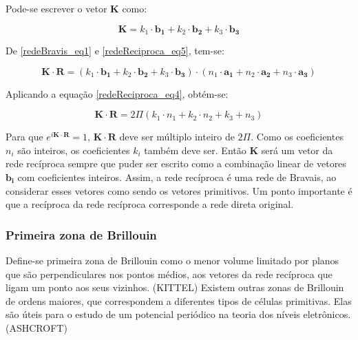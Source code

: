 \documentclass[11pt]{article}
\numberwithin{equation}{section}
\begin{document}
      \par Pode-se escrever o vetor \textbf{K} como:

      \begin{equation}\label{redeReciproca_eq5}
        \mathbf{K} = k_{1}\cdot \mathbf{b_{1}} + k_{2}\cdot \mathbf{b_{2}} + k_{3}\cdot \mathbf{b_{3}}
      \end{equation}

      \par De \eqref{redeBravis_eq1} e \eqref{redeReciproca_eq5}, tem-se:

      \begin{equation}\label{redeReciproca_eq6}
        \mathbf{K} \cdot \mathbf{R} = (k_{1} \cdot \mathbf{b_{1}} + k_{2} \cdot \mathbf{b_{2}} + k_{3} \cdot \mathbf{b_{3}})\cdot(n_{1} \cdot \mathbf{a_{1}} + n_{2} \cdot \mathbf{a_{2}} + n_{3} \cdot \mathbf{a_{3}})
      \end{equation}

      \par Aplicando a equação \eqref{redeReciproca_eq4}, obtém-se:

      \begin{equation}\label{redeReciproca_eq6}
        \mathbf{K} \cdot \mathbf{R} = 2 \Pi (k_{1} \cdot n_{1} + k_{2} \cdot n_{2} + k_{3} + n_{3})
      \end{equation}

      \par Para que $e^{i\mathbf{K} \cdot \mathbf{R}} = 1$, $\mathbf{K} \cdot \mathbf{R}$ deve ser múltiplo inteiro de $2 \Pi$. Como os coeficientes $n_{i}$ são inteiros, os coeficientes $k_{i}$ também deve ser. Então \textbf{K} será um vetor da rede recíproca sempre que puder ser escrito como a combinação linear de vetores $\mathbf{b_{i}}$ com coeficientes inteiros. Assim, a rede recíproca é uma rede de Bravais, ao considerar esses vetores como sendo os vetores primitivos. Um ponto importante é que a recíproca da rede recíproca corresponde a rede direta original.

    \subsubsection{Primeira zona de Brillouin} %

      \par Define-se primeira zona de Brillouin como o menor volume limitado por planos que são perpendiculares nos pontos médios, aos vetores da rede recíproca que ligam um ponto aos seus vizinhos. (KITTEL) Existem outras zonas de Brillouin de ordens maiores, que correspondem a diferentes tipos de células primitivas. Elas são úteis para o estudo de um potencial periódico na teoria dos níveis eletrônicos. (ASHCROFT)
\end{document}
